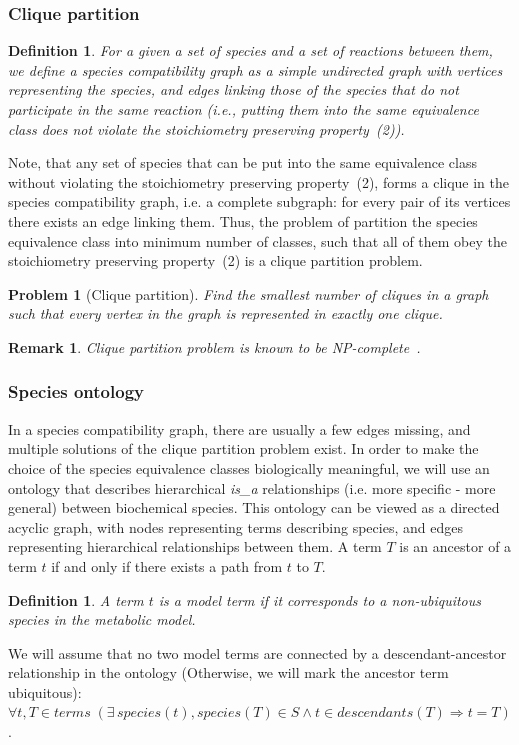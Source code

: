 \documentclass[10pt]{bmc_article}
\newenvironment{bmcformat}{\baselineskip20pt\sloppy\setboolean{publ}{false}}{\baselineskip20pt\sloppy}
\begin{document}
\begin{bmcformat}
\subsubsection*{Clique partition}
\newtheorem{scg}[def]{Definition}
\begin{scg}
For a given a set of species and a set of reactions between them, we define a \emph{species compatibility graph} as a simple undirected graph with vertices representing the species, and edges linking those of the species that do not participate in the same reaction (i.e., putting them into the same equivalence class does not violate the stoichiometry preserving property~(2)).
\end{scg}
Note, that any set of species that can be put into the same equivalence class without violating the stoichiometry preserving property~(2), forms a clique  in the species compatibility graph, i.e. a complete subgraph: for every pair of its vertices there exists an edge linking them. Thus, the problem of partition the species equivalence class into minimum number of classes, such that all of them obey the stoichiometry preserving property~(2) is a clique partition problem.
\newtheorem{clp}[pbm]{Problem}
\begin{clp}[Clique partition]
Find the smallest number of cliques in a graph such that every vertex in the graph is represented in exactly one clique.
\end{clp}
\newtheorem{rem0}[rm]{Remark}
\begin{rem0}
Clique partition problem is known to be \textit{NP}-complete~\cite{Bhasker1991}. 
\end{rem0}

\subsubsection*{Species ontology}
In a species compatibility graph, there are usually a few edges missing, and multiple solutions of the clique partition problem exist. In order to make the choice of the species equivalence classes biologically meaningful, we will use an ontology that describes hierarchical \textit{is\_a} relationships (i.e. more specific - more general) between biochemical species. This ontology can be viewed as a directed acyclic graph, with nodes representing terms describing species, and edges representing hierarchical relationships between them. A term $T$ is an ancestor of a term $t$ if and only if there exists a path from $t$ to $T$. 

\newtheorem{mt}[def]{Definition}
\begin{mt}
A term $t$ is a \emph{model term} if it corresponds to a non-ubiquitous species in the metabolic model. 
\end{mt}
We will assume that no two model terms are connected by a descendant-ancestor relationship in the ontology (Otherwise, we will mark the ancestor term ubiquitous): \\
$\forall t, T \in terms \; (\exists\, species(t), species(T) \in S \land t \in descendants(T) \Rightarrow t = T)$.


\end{bmcformat}
\end{document}
